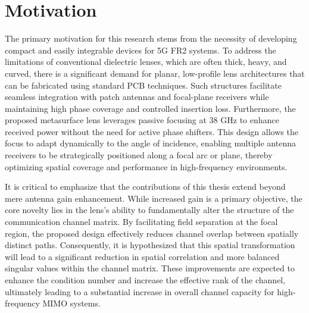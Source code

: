 \section{Motivation}
The primary motivation for this research stems from the necessity of developing compact and easily integrable devices for 5G FR2 systems. To address the limitations of conventional dielectric lenses, which are often thick, heavy, and curved, there is a significant demand for planar, low-profile lens architectures that can be fabricated using standard PCB techniques. Such structures facilitate seamless integration with patch antennas and focal-plane receivers while maintaining high phase coverage and controlled insertion loss. Furthermore, the proposed metasurface lens leverages passive focusing at 38 GHz to enhance received power without the need for active phase shifters. This design allows the focus to adapt dynamically to the angle of incidence, enabling multiple antenna receivers to be strategically positioned along a focal arc or plane, thereby optimizing spatial coverage and performance in high-frequency environments.



It is critical to emphasize that the contributions of this thesis extend beyond mere antenna gain enhancement. While increased gain is a primary objective, the core novelty lies in the lens's ability to fundamentally alter the structure of the communication channel matrix. By facilitating field separation at the focal region, the proposed design effectively reduces channel overlap between spatially distinct paths. Consequently, it is hypothesized that this spatial transformation will lead to a significant reduction in spatial correlation and more balanced singular values within the channel matrix. These improvements are expected to enhance the condition number and increase the effective rank of the channel, ultimately leading to a substantial increase in overall channel capacity for high-frequency MIMO systems.

